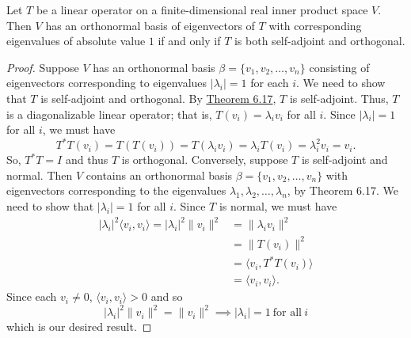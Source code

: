\begin{corollary}
    Let \( T  \) be a linear operator on a finite-dimensional real inner product space \( V  \). Then \( V  \) has an orthonormal basis of eigenvectors of \( T  \) with corresponding eigenvalues of absolute value \( 1  \) if and only if \( T  \) is both self-adjoint and orthogonal.
\end{corollary}
\begin{proof}
Suppose \( V  \) has an orthonormal basis \( \beta = \{ {v}_{1}, {v}_{2}, \dots, {v}_{n} \}  \) consisting of eigenvectors corresponding to eigenvalues \( | {\lambda}_{i} | = 1    \) for each \( i  \). We need to show that \( T  \) is self-adjoint and orthogonal. By {\hyperref[Theorem 6.17]{Theorem 6.17}}, \( T  \) is self-adjoint. Thus, \( T  \) is a diagonalizable linear operator; that is, \( T({v}_{i}) = {\lambda}_{i} {v}_{i} \) for all \( i  \). Since \( | {\lambda}_{i} |  = 1  \) for all \( i  \), we must have
\[  T^{*}T({v}_{i}) = T(T({v}_{i})) = T({\lambda}_{i} {v}_{i} ) = {\lambda}_{i} T({v}_{i}) = {\lambda}_{i}^{2} {v}_{i} = {v}_{i}.   \]
So, \( T^{*}T = I  \) and thus \( T  \) is orthogonal. Conversely, suppose \( T  \) is self-adjoint and normal. Then \( V  \) contains an orthonormal basis \( \beta = \{ {v}_{1}, {v}_{2}, \dots, {v}_{n} \}    \) with eigenvectors corresponding to the eigenvalues \( {\lambda}_{1}, {\lambda}_{2}, \dots, {\lambda}_{n} \), by Theorem 6.17. We need to show that \( | {\lambda}_{i} |  =  1  \) for all \( i \). Since \( T  \) is normal, we must have
\begin{align*}
    | {\lambda}_{i} |^{2} \langle {v}_{i}  , {v}_{i} \rangle = | {\lambda}_{i} |^{2} \|{v}_{i}\|^{2} &= \|{\lambda}_{i} {v}_{i}\|^{2}  \\
                                                                                                 &= \|T({v}_{i})\|^{2} \\
                                                                                                 &= \langle {v}_{i}  ,  T^{*}T({v}_{i}) \rangle \\
                                                                                                 &= \langle {v}_{i}  , {v}_{i} \rangle.
\end{align*}
Since each \( {v}_{i} \neq 0  \), \( \langle {v}_{i} ,  {v}_{i} \rangle > 0  \) and so
\[  | {\lambda}_{i} |^{2} \|{v}_{i}\|^{2} = \|{v}_{i}\|^{2} \implies | {\lambda}_{i} | = 1  \  \text{for all} \  i \]
which is our desired result.
\end{proof}

